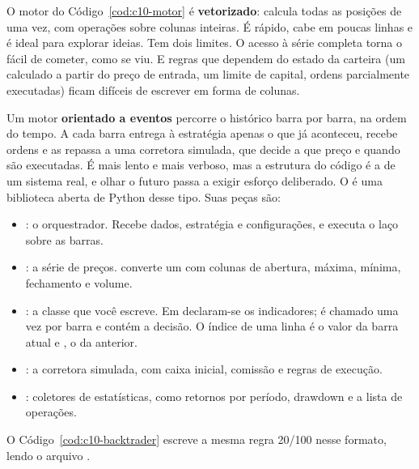 O motor do Código~\ref{cod:c10-motor} é \textbf{vetorizado}: calcula todas as posições de uma vez, com operações sobre colunas inteiras. É rápido, cabe em poucas linhas e é ideal para explorar ideias. Tem dois limites. O acesso à série completa torna o  fácil de cometer, como se viu. E regras que dependem do estado da carteira (um  calculado a partir do preço de entrada, um limite de capital, ordens parcialmente executadas) ficam difíceis de escrever em forma de colunas.

Um motor \textbf{orientado a eventos} percorre o histórico barra por barra, na ordem do tempo. A cada barra entrega à estratégia apenas o que já aconteceu, recebe ordens e as repassa a uma corretora simulada, que decide a que preço e quando são executadas. É mais lento e mais verboso, mas a estrutura do código é a de um sistema real, e olhar o futuro passa a exigir esforço deliberado. O  é uma biblioteca aberta de Python desse tipo. Suas peças são:

\begin{itemize}
  \item \textbf{}: o orquestrador. Recebe dados, estratégia e configurações, e executa o laço sobre as barras.
  \item \textbf{}: a série de preços.  converte um  com colunas de abertura, máxima, mínima, fechamento e volume.
  \item \textbf{}: a classe que você escreve. Em  declaram-se os indicadores;  é chamado uma vez por barra e contém a decisão. O índice \cod{[0]} de uma linha é o valor da barra atual e \cod{[-1]}, o da anterior.
  \item \textbf{}: a corretora simulada, com caixa inicial, comissão e regras de execução.
  \item \textbf{}: coletores de estatísticas, como retornos por período, drawdown e a lista de operações.
\end{itemize}

O Código~\ref{cod:c10-backtrader} escreve a mesma regra 20/100 nesse formato, lendo o arquivo .



